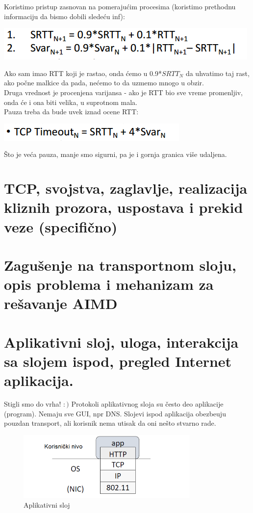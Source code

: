 \documentclass{article} %
\begin{document}
 Koristimo pristup zasnovan na pomerajućim procesima (koristimo prethodnu informaciju da bismo dobili sledeću inf):
 \begin{center}
	\includegraphics[scale=0.5]{retr4}
\end{center}
Ako sam imao RTT koji je rastao, onda ćemo u 0.9*$SRTT_{N}$ da uhvatimo taj rast, ako počne malkice da pada, nećemo to da uzmemo mnogo u obzir.\\
Druga vrednost je procenjena varijansa - ako je RTT bio sve vreme promenljiv, onda će i ona biti velika, u suprotnom mala.\\
Pauza treba da bude uvek iznad ocene RTT:
 \begin{center}
	\includegraphics[scale=0.5]{retr5}
\end{center}
Što je veća pauza, manje smo sigurni, pa je i gornja granica više udaljena.
\section{TCP, svojstva, zaglavlje, realizacija kliznih prozora, uspostava i prekid veze (specifično)}
\section{Zagušenje na transportnom sloju, opis problema i mehanizam za rešavanje AIMD}
\section{Aplikativni sloj, uloga, interakcija sa slojem ispod, pregled Internet aplikacija.}


\noindent Stigli smo do vrha! $:)$ Protokoli aplikativnog sloja su \v cesto deo aplikacije (program). Nemaju sve GUI, npr DNS. Slojevi ispod aplikacija obezbe\dj uju pouzdan transport, ali korisnik nema utisak da oni ne\v sto stvarno rade.

\begin{figure}[H]
	\centering
	\includegraphics[width=0.8\textwidth]{slike-aplikativniSloj/aplikativni-sloj.png}
	\caption{Aplikativni sloj}\label{aplikativni sloj}
\end{figure}
\end{document}
